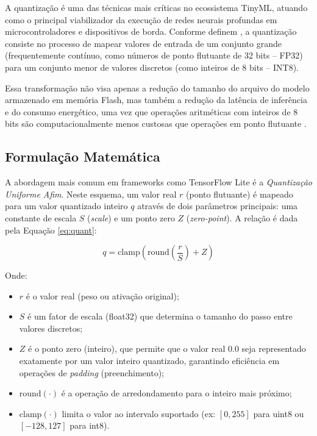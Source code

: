 \documentclass[repeatfields,xlists,xpacks,oneside]{ufrgscca}
\begin{document}
A quantização é uma das técnicas mais críticas no ecossistema TinyML, atuando como o principal viabilizador da execução de redes neurais profundas em microcontroladores e dispositivos de borda. Conforme definem \cite{Jacob2018}, a quantização consiste no processo de mapear valores de entrada de um conjunto grande (frequentemente contínuo, como números de ponto flutuante de 32 bits -- FP32) para um conjunto menor de valores discretos (como inteiros de 8 bits -- INT8).

Essa transformação não visa apenas a redução do tamanho do arquivo do modelo armazenado em memória Flash, mas também a redução da latência de inferência e do consumo energético, uma vez que operações aritméticas com inteiros de 8 bits são computacionalmente menos custosas que operações em ponto flutuante \cite{Gholami2021}.

\subsection{Formulação Matemática}
A abordagem mais comum em frameworks como TensorFlow Lite é a \textit{Quantização Uniforme Afim}. Neste esquema, um valor real $r$ (ponto flutuante) é mapeado para um valor quantizado inteiro $q$ através de dois parâmetros principais: uma constante de escala $S$ (\textit{scale}) e um ponto zero $Z$ (\textit{zero-point}). A relação é dada pela Equação \ref{eq:quant}:

\begin{equation}
q = \text{clamp}\left( \text{round}\left( \frac{r}{S} \right) + Z \right)
\label{eq:quant}
\end{equation}

Onde:
\begin{itemize}
    \item $r$ é o valor real (peso ou ativação original);
    \item $S$ é um fator de escala (float32) que determina o tamanho do passo entre valores discretos;
    \item $Z$ é o ponto zero (inteiro), que permite que o valor real $0.0$ seja representado exatamente por um valor inteiro quantizado, garantindo eficiência em operações de \textit{padding} (preenchimento);
    \item $\text{round}(\cdot)$ é a operação de arredondamento para o inteiro mais próximo;
    \item $\text{clamp}(\cdot)$ limita o valor ao intervalo suportado (ex: $[0, 255]$ para uint8 ou $[-128, 127]$ para int8).
\end{itemize}
\end{document}
